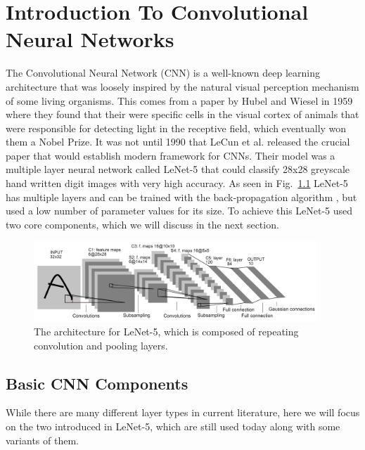 \chapter{Introduction To Convolutional Neural Networks}
The Convolutional Neural Network (CNN) is a well-known deep learning architecture that was loosely inspired by the natural visual perception mechanism of some living organisms.
This comes from a paper by Hubel and Wiesel \cite{hubel1968receptive} in 1959 where they found that their were specific cells in the visual cortex of animals that were responsible for detecting light in the receptive field, which eventually won them a Nobel Prize. 
It was not until 1990 that LeCun et al. \cite{lecun1990handwritten} released the crucial paper that would establish modern framework for CNNs. 
Their model was a multiple layer neural network called LeNet-5 that could classify 28x28 greyscale hand written digit images with very high accuracy. 
As seen in Fig.~\ref{f:lenet} LeNet-5 has multiple layers and can be trained with the back-propagation algorithm \cite{hecht1988theory}, but used a low number of parameter values for its size. 
To achieve this LeNet-5 used two core components, which we will discuss in the next section.

\begin{figure}[h!]
	\centering
		\includegraphics[width=0.95\textwidth]{figures/lenet5.png}
	\caption{The architecture for LeNet-5, which is composed of repeating convolution and pooling layers.}
	\label{f:lenet}
\end{figure}

\section{Basic CNN Components}
While there are many different layer types in current literature, here we will focus on the two introduced in LeNet-5, which are still used today along with some variants of them. 

